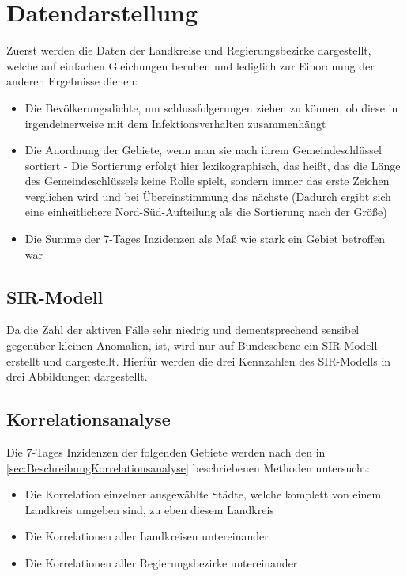 \section{Datendarstellung}
Zuerst werden die Daten der Landkreise und Regierungsbezirke dargestellt, welche auf einfachen Gleichungen beruhen und lediglich zur Einordnung der anderen Ergebnisse dienen:
\begin{itemize}
    \item Die Bevölkerungsdichte, um schlussfolgerungen ziehen zu können, ob diese in irgendeinerweise mit dem Infektionsverhalten zusammenhängt
    \item Die Anordnung der Gebiete, wenn man sie nach ihrem Gemeindeschlüssel sortiert - Die Sortierung erfolgt hier lexikographisch, das heißt, das die Länge des Gemeindeschlüssels keine Rolle spielt, sondern immer das erste Zeichen verglichen wird und bei Übereinstimmung das nächste (Dadurch ergibt sich eine einheitlichere Nord-Süd-Aufteilung als die Sortierung nach der Größe)
    \item Die Summe der 7-Tages Inzidenzen als Maß wie stark ein Gebiet betroffen war
\end{itemize}
\subsection{SIR-Modell}
Da die Zahl der aktiven Fälle sehr niedrig und dementsprechend sensibel gegenüber kleinen Anomalien, ist, wird nur auf Bundesebene ein SIR-Modell erstellt und dargestellt. 
Hierfür werden die drei Kennzahlen des SIR-Modells in drei Abbildungen dargestellt.

\subsection{Korrelationsanalyse}
Die 7-Tages Inzidenzen der folgenden Gebiete werden nach den in \autoref{sec:BeschreibungKorrelationsanalyse} beschriebenen Methoden untersucht:
\begin{itemize}
    \item Die Korrelation einzelner ausgewählte Städte, welche komplett von einem Landkreis umgeben sind, zu eben diesem Landkreis
    \item Die Korrelationen aller Landkreisen untereinander
    \item Die Korrelationen aller Regierungsbezirke untereinander
\end{itemize}

